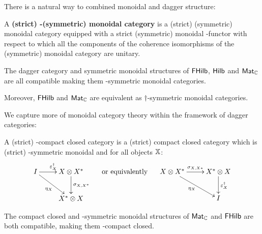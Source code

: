 There is a natural way to combined monoidal and dagger structure:
\begin{definition}
A {\bf  (strict) \dag-(symmetric) monoidal category} is a (strict) (symmetric) monoidal category equipped with a strict (symmetric) monoidal \dag-functor with respect to which all the components of the  coherence isomorphisms of the (symmetric) monoidal category are unitary.
\end{definition}
\begin{example}
The dagger category and symmetric monoidal structures of $\mathsf{FHilb}$, $\mathsf{Hilb}$ and $\mathsf{Mat}_{\mathbb{C}}$ are all compatible making them \dag-symmetric monoidal categories.

Moreover, $\mathsf{FHilb}$ and $\mathsf{Mat}_{\mathbb{C}}$  are equivalent as $\dag$-symmetric monoidal categories.
\end{example}
We capture more of monoidal category theory within the framework of dagger categories:
\begin{definition}
A {(strict) \dag-compact closed category} is a (strict) compact closed category which is (strict) \dag-symmetric monoidal and for all objects $\mathbb{X}$:
$$
\xymatrix{
I \ar[r]^{\epsilon_X^\dag} \ar[dr]_{\eta_X}   &  X\otimes X^* \ar[d]^{\sigma_{X,X^*}}\\
 &  X^* \otimes X 
}
\hspace*{.5cm}
\text{or equivalently}
\hspace*{.5cm}
\xymatrix{
X\otimes X^* \ar[dr]_{\eta_X} \ar[r]^{\sigma_{X,X*}}
 & X^* \otimes X  \ar[d]^{\epsilon_X^\dag}\\
& I
}
$$
\end{definition}
\begin{example}
The compact closed and \dag-symmetric monoidal structures of $\mathsf{Mat}_{\mathbb{C}}$ and $\mathsf{FHilb}$ are both compatible, making them \dag-compact closed.
\end{example}
